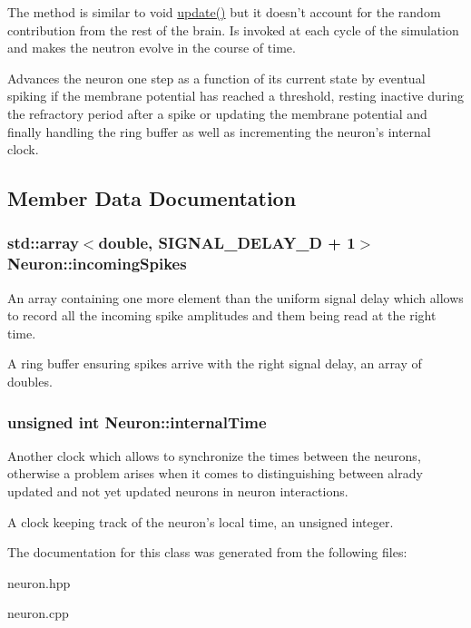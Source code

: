 The method is similar to void \hyperlink{classNeuron_a782b3b728eee5097ab205a7a7990225b}{update()} but it doesn't account for the random contribution from the rest of the brain. Is invoked at each cycle of the simulation and makes the neutron evolve in the course of time. 

Advances the neuron one step as a function of its current state by eventual spiking if the membrane potential has reached a threshold, resting inactive during the refractory period after a spike or updating the membrane potential and finally handling the ring buffer as well as incrementing the neuron's internal clock. 

\subsection{Member Data Documentation}
\hypertarget{classNeuron_a15160c28823ad0e63f171af31fd6b1ea}{
\subsubsection[{incoming\-Spikes}]{\setlength{\rightskip}{0pt plus 5cm}std\-::array$<$double, S\-I\-G\-N\-A\-L\-\_\-\-D\-E\-L\-A\-Y\-\_\-\-D + 1$>$ Neuron\-::incoming\-Spikes\hspace{0.3cm}{\ttfamily [private]}}}\label{classNeuron_a15160c28823ad0e63f171af31fd6b1ea}


An array containing one more element than the uniform signal delay which allows to record all the incoming spike amplitudes and them being read at the right time. 

A ring buffer ensuring spikes arrive with the right signal delay, an array of doubles. \hypertarget{classNeuron_adb1a016b5d339ba3ba95367bb66f391a}{
\subsubsection[{internal\-Time}]{\setlength{\rightskip}{0pt plus 5cm}unsigned int Neuron\-::internal\-Time\hspace{0.3cm}{\ttfamily [private]}}}\label{classNeuron_adb1a016b5d339ba3ba95367bb66f391a}


Another clock which allows to synchronize the times between the neurons, otherwise a problem arises when it comes to distinguishing between alrady updated and not yet updated neurons in neuron interactions. 

A clock keeping track of the neuron's local time, an unsigned integer. 

The documentation for this class was generated from the following files\-:\begin{DoxyCompactItemize}
\item 
neuron.\-hpp\item 
neuron.\-cpp\end{DoxyCompactItemize}
